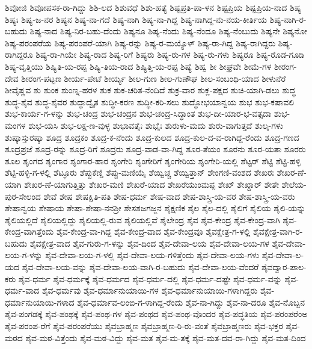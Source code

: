 ಶಿವೋಜಿ
ಶಿವೋಪಸಕ-ರಾ-ಗಿದ್ದು
ಶಿಶಿ-ಲದ
ಶಿಶುವಧೆ
ಶಿಶು-ಹತ್ಯೆ
ಶಿಷ್ಟಪ್ರತಿ-ಪಾ-ಳನ
ಶಿಷ್ಟಪ್ರಿಯ
ಶಿಷ್ಟಪ್ರಿಯ-ನಾದ
ಶಿಷ್ಯ
ಶಿಷ್ಯಃ
ಶಿಷ್ಯ-ಜ-ನರ
ಶಿಷ್ಯನ
ಶಿಷ್ಯ-ನಾ-ಗದೆ
ಶಿಷ್ಯ-ನಾಗಿ
ಶಿಷ್ಯ-ನಾ-ಗಿದ್ದ
ಶಿಷ್ಯ-ನಾಗಿದ್ದ-ನು-ನಯ-ಕೀರ್ತಿಯ
ಶಿಷ್ಯ-ನಾಗಿ-ರ-ಬಹುದು
ಶಿಷ್ಯ-ನಾದ
ಶಿಷ್ಯ-ನಿರ-ಬಹು-ದೆಂದು
ಶಿಷ್ಯನೂ
ಶಿಷ್ಯ-ನೆಂದು
ಶಿಷ್ಯ-ನೆಂದೂ
ಶಿಷ್ಯ-ನೆಂಬುದು
ಶಿಷ್ಯನೇ
ಶಿಷ್ಯನೋ
ಶಿಷ್ಯ-ಪರಂಪರೆಯ
ಶಿಷ್ಯ-ಪರಂಪರೆ-ಯಾಗಿ
ಶಿಷ್ಯ-ರನ್ನು
ಶಿಷ್ಯ-ರ-ಮಯ್ಯೊಳ್
ಶಿಷ್ಯ-ರಾ-ಗಿದ್ದ
ಶಿಷ್ಯ-ರಾಗಿದ್ದರು
ಶಿಷ್ಯ-ರಾಗಿದ್ದರೂ
ಶಿಷ್ಯ-ರಾ-ಗಿಯೇ
ಶಿಷ್ಯ-ರಾದ
ಶಿಷ್ಯ-ರಿಗೆ
ಶಿಷ್ಯರು
ಶಿಷ್ಯ-ರು-ಗಳ
ಶಿಷ್ಯ-ರು-ಗಳು
ಶಿಷ್ಯರೂ
ಶಿಷ್ಯ-ರೊಡ-ಗೂಡಿ
ಶಿಷ್ಯ-ವೃತ್ತಿಯು
ಶಿಷ್ಯಿತಿ-ಯ-ರಪ್ಪ
ಶಿಷ್ಯಿ-ತಿಯ-ರಾದ
ಶಿಷ್ಯಿತ್ತಿ-ಯ-ರಪ್ಪ
ಶಿಷ್ಯೆ
ಶಿಹ್ವ
ಶೀ
ಶೀಘ್ರವೇ
ಶೀಮೆ-ಗಳ
ಶೀರಂಗ-ದೇವ
ಶೀರಂಗ-ಪಟ್ಟಣ
ಶೀರ್ಯ-ಪೇಟೆ
ಶೀರ್ಯ್ಯ
ಶೀಲ-ಗುಣ
ಶೀಲ-ಗುಣೌಘ
ಶೀಲ-ಸಂಬಂಧಿ-ಯಾದ
ಶೀಳುನೆರೆ
ಶೀವೈಷ್ಣವ
ಶು
ಶುಂಕ
ಶುಂಣ್ನ-ಹರಳ
ಶುಕ
ಶುಕ-ಚರಿತ-ನೆಂದಿದೆ
ಶುಕ್ರ-ವಾರ
ಶುಕ್ಲ-ಪಕ್ಷದ
ಶುಚಿ-ಯಾಗಿ-ಡಲು
ಶುದ್ಧ
ಶುದ್ಧ-ಶೈವ
ಶುದ್ಧ-ಶೈವರ
ಶುದ್ಧಾದ್ವೈತ
ಶುದ್ಧೀ-ಕರಣ
ಶುದ್ಧೀ-ಕರಿ-ಸಲು
ಶುದ್ಧೋಭಯಾನ್ವಯ
ಶುಭ
ಶುಭ-ಕಷಾವಲಿ
ಶುಭ-ಕಾರ್ಯ-ಗ-ಳನ್ನು
ಶುಭ-ಚಂದ್ರ
ಶುಭ-ಚಂದ್ರನ
ಶುಭ-ಚಂದ್ರ-ಸಿದ್ಧಾಂತ
ಶುಭ-ದೀ-ಯಾರ-ಭ-ವತ್ಸದಾ
ಶುಭ-ಮಂಗಳ
ಶುಭ-ಯಸಿ
ಶುಭ-ಲಕ್ಷ-ಣ-ವುಳ್ಳ
ಶುಭಾವತೈಃ
ಶುಭೈಃ
ಶುರುಳು-ಮದು
ಶುರು-ವಾಗುತ್ತದೆ
ಶುಲ್ಕ-ಗಳು
ಶುಷ್ಕಾಸ್ತುರಷ್ಕಾ
ಶೂದ್ರ
ಶೂದ್ರಕಂ
ಶೂದ್ರ-ಕ-ನೆಂದು
ಶೂದ್ರ-ಕುಲದ
ಶೂದ್ರ-ಕುಲ-ದ-ವ-ರಾಗಿದ್ದ-ರೆಂದು
ಶೂದ್ರ-ಗಣದ
ಶೂದ್ರಪ್ರಜೆ
ಶೂದ್ರ-ರನ್ನು
ಶೂದ್ರ-ರಿಗೆ
ಶೂದ್ರರು
ಶೂದ್ರ-ವಾಡ-ವಾ-ಗಿದ್ದ
ಶೂರ-ತೆಯಂ
ಶೂರನು
ಶೂರ-ಯತಾ
ಶೂರರು
ಶೂಲ
ಶೃಂಗದ
ಶೃಂಗಾರ
ಶೃಂಗಾರ-ಹಾರ
ಶೃಂಗೇರಿ
ಶೃಂಗೇರಿಗೆ
ಶೃಂಗೇರಿಯ
ಶೃಂಗೇರಿ-ಯಲ್ಲಿ
ಶೆಟ್ಟರ್
ಶೆಟ್ಟಿ
ಶೆಟ್ಟಿ-ಹಳ್ಳಿ
ಶೆಟ್ಟಿ-ಹಳ್ಳಿ-ಗ-ಳಲ್ಲಿ
ಶೆಟ್ಳೂರು
ಶೆಪ್ಪುಕೆಣ್ಡಿ
ಶೆಪ್ಪು-ಮಣಿಯೈ
ಶೆಯ್ವಿಚ್ಚ
ಶೆಯ್ವಿತ್ತಾನ್
ಶೇಂಗಣಿ-ವಂಶದ
ಶೇಖರಃ
ಶೇಖರ-ಣೆ-ಯಾಗಿ
ಶೇಖರ-ಣೆ-ಯಾಗುತ್ತಿತ್ತು
ಶೇಖರ-ಮಣಿ
ಶೇಖರೆ-ಯಾದ
ಶೇಖರೆಯುಂಮಪ್ಪ
ಶೇಖ್
ಶೇಖ್ದಾರ್
ಶೇತೇ
ಶೇಲೆಯ-ಪುರ-ಸೇಲಂದ
ಶೇವೆ
ಶೇಷ
ಶೇಷಕ್ಷಿತಿ-ಪತಿ
ಶೇಷ-ಧರ್ಮ
ಶೇಷ-ವಾದ
ಶೇಷ-ಶಾಸ್ತ್ರಿ-ಯ-ವರ
ಶೇಷ-ಶಾಸ್ತ್ರಿ-ಯ-ವರು
ಶೇಷಾನ್ವಯ
ಶೇಷಾಯ
ಶೇಷಾ-ಶೇಷಾ-ನನಶ್ರೀ
ಶೇಸಶಜಗಜ್ಜನ
ಶೈಕ್ಷಣಿಕ
ಶೈಲ
ಶೈಲ-ದಲ್ಲಿ
ಶೈಲಿಗೆ
ಶೈಲಿಯ
ಶೈಲಿ-ಯನ್ನು
ಶೈಲಿಯಲ್ಲಿದೆ
ಶೈಲಿಯಲ್ಲಿದ್ದು
ಶೈಲಿಯಲ್ಲಿ-ರುವ
ಶೈಲಿಯಲ್ಲಿವೆ
ಶೈಲೇಂದ್ರ
ಶೈವ
ಶೈವ-ಕೇಂದ್ರ
ಶೈವ-ಕೇಂದ್ರ-ವಾಗಿ
ಶೈವ-ಕೇಂದ್ರ-ವಾಗಿತ್ತೆಂದು
ಶೈವ-ಕೇಂದ್ರ-ವಾ-ಗಿದ್ದ
ಶೈವ-ಕೇಂದ್ರ-ವಾದ
ಶೈವ-ಕೇಂದ್ರವೂ
ಶೈವಕ್ಷೇತ್ರ-ಗ-ಳಲ್ಲಿ
ಶೈವಕ್ಷೇತ್ರ-ವಾಗಿ-ರ-ಬಹುದು
ಶೈವಕ್ಷೇತ್ರ-ವಾದ
ಶೈವ-ಗುರು-ಗ-ಳನ್ನು
ಶೈವ-ದಿಂದ
ಶೈವ-ದೇವಾ-ಲಯ
ಶೈವ-ದೇವಾ-ಲಯ-ಗಳ
ಶೈವ-ದೇವಾ-ಲಯ-ಗ-ಳನ್ನು
ಶೈವ-ದೇವಾ-ಲಯ-ಗ-ಳಲ್ಲಿ
ಶೈವ-ದೇವಾ-ಲಯ-ಗಳಿತ್ತೆಂದು
ಶೈವ-ದೇವಾ-ಲಯ-ಗಳು
ಶೈವ-ದೇವಾ-ಲ-ಯದ
ಶೈವ-ದೇವಾ-ಲಯ-ವನ್ನು
ಶೈವ-ದೇವಾ-ಲಯ-ವಾಗಿ-ರ-ಬಹುದು
ಶೈವ-ದೇವಾ-ಲಯ-ವೆಂದರೆ
ಶೈವದ್ವಾರ-ಪಾಲ-ಕರು
ಶೈವ-ಧರ್ಮ
ಶೈವ-ಧರ್ಮಕ್ಕೆ
ಶೈವ-ಧರ್ಮದ
ಶೈವ-ಧರ್ಮ-ದಲ್ಲಿ
ಶೈವ-ಧರ್ಮ-ದಷ್ಟೇ
ಶೈವ-ಧರ್ಮ-ವನ್ನು
ಶೈವ-ಧರ್ಮ-ವಾದ
ಶೈವ-ಧರ್ಮವು
ಶೈವ-ಧರ್ಮಾನುಯಾಯಿ-ಗಳ
ಶೈವ-ಧರ್ಮಾನುಯಾಯಿ-ಗಳಾಗಿದ್ದರು
ಶೈವ-ಧರ್ಮಾನುಯಾಯಿ-ಗಳಾದ
ಶೈವ-ಧರ್ಮಾವ-ಲಂಬಿ-ಗ-ಳಾಗಿದ್ದ-ರೆಂದು
ಶೈವ-ನಾ-ಗಿದ್ದು
ಶೈವ-ನಾ-ದರೂ
ಶೈವ-ನೊಬ್ಬನ
ಶೈವ-ಪಂಗಡಕ್ಕೆ
ಶೈವ-ಪಂಥಕ್ಕೆ
ಶೈವ-ಪಂಥ-ಗಳ
ಶೈವ-ಪಂಥದ
ಶೈವ-ಪಂಥ-ವೊಂದರ
ಶೈವ-ಪದ್ಧತಿಯ
ಶೈವ-ಪರಂಪರೆಂಅ
ಶೈವ-ಪರಂಪ-ರೆಗೆ
ಶೈವ-ಪರಂಪರೆಯು
ಶೈವಬ್ರಾಹ್ಮಣ
ಶೈವಬ್ರಾಹ್ಮಣ-ರಿ-ರು-ವಂತೆ
ಶೈವಬ್ರಾಹ್ಮಣರು
ಶೈವ-ಭಕ್ತರ
ಶೈವ-ಮಠದ
ಶೈವ-ಮಠ-ವಿತ್ತೆಂದು
ಶೈವ-ಮಠ-ವಿದ್ದು
ಶೈವ-ಮತ
ಶೈವ-ಮ-ತಕ್ಕೆ
ಶೈವ-ಮತ-ದವ-ರಾ-ಗಿದ್ದು
ಶೈವ-ಮತ-ದಿಂದ
